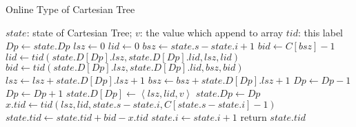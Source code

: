 \begin{algorithm*}[!thb]
  \caption{Online Type of Cartesian Tree}
  \label{alg:cartesian-encode-online}
  \begin{algorithmic}[1]
  \Require
      $\mathit{state}$: state of Cartesian Tree;
      $v$: the value which append to array
  \Ensure
      $\mathit{tid}$: this label
  \State $\textit{Dp} \gets \textit{state}.\textit{Dp}$
  \State $\textit{lsz} \gets 0$ 
  \State $\textit{lid} \gets 0$
  \State $\textit{bsz} \gets \textit{state}.\textit{s} - \textit{state}.\textit{i} + 1$
  \State $\textit{bid} \gets C[\textit{bsz}] - 1$
    \State $\textit{lid} \gets \textit{tid}(\textit{state}.D[\textit{Dp}].\textit{lsz}, \textit{state}.D[\textit{Dp}].\textit{lid}, \textit{lsz}, \textit{lid})$
    \State $\textit{bid} \gets \textit{tid}(\textit{state}.D[\textit{Dp}].\textit{lsz}, \textit{state}.D[\textit{Dp}].\textit{lid}, \textit{bsz}, \textit{bid})$
    \State $\textit{lsz} \gets \textit{lsz} + \textit{state}.D[\textit{Dp}].\textit{lsz}+1$
    \State $\textit{bsz} \gets \textit{bsz} + \textit{state}.D[\textit{Dp}].\textit{lsz}+1$
    \State $\textit{Dp} \gets \textit{Dp} - 1$
  \EndWhile
  \State $\textit{Dp} \gets \textit{Dp} + 1$
  \State $\textit{state}.D[\textit{Dp}] \gets \left \langle \textit{lsz}, \textit{lid}, \textit{v} \right \rangle$
  \State $\textit{state}.\textit{Dp} \gets \textit{Dp}$
  \State $x.\textit{tid} \gets \textit{tid}(\textit{lsz}, \textit{lid}, \textit{state}.s-\textit{state}.i, C[\textit{state}.s-\textit{state}.i]-1)$
  \State $\textit{state}.\textit{tid} \gets \textit{state}.\textit{tid} + \textit{bid} - x.\textit{tid}$
  \State $\textit{state}.i \gets \textit{state}.i + 1$
  \State return $\textit{state}.\textit{tid}$
  \end{algorithmic}
\end{algorithm*}